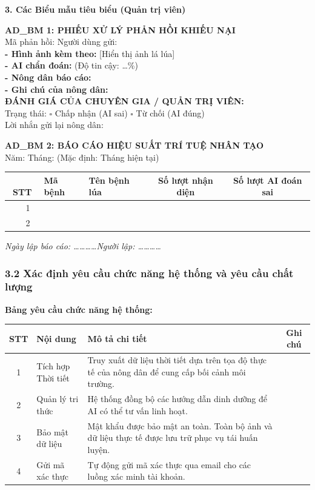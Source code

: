 \documentclass[12pt,a4paper]{article}
\begin{document}
\vspace{0.5cm}
\noindent \textbf{3. Các Biểu mẫu tiêu biểu (Quản trị viên)}

\noindent \textbf{AD\_BM 1: PHIẾU XỬ LÝ PHẢN HỒI KHIẾU NẠI} \\
Mã phản hồi: \dotfill Người dùng gửi: \dotfill \\
\textbf{- Hình ảnh kèm theo:} [Hiển thị ảnh lá lúa] \\
\textbf{- AI chẩn đoán:} \dotfill (Độ tin cậy: \dots \%) \\
\textbf{- Nông dân báo cáo:} \dotfill \\
\textbf{- Ghi chú của nông dân:} \dotfill \\
\vspace{0.2cm}
\textbf{ĐÁNH GIÁ CỦA CHUYÊN GIA / QUẢN TRỊ VIÊN:} \\
Trạng thái: $\square$ Chấp nhận (AI sai) \quad $\square$ Từ chối (AI đúng) \\
Lời nhắn gửi lại nông dân: \dotfill \\
\dotfill

\vspace{0.5cm}
\noindent \textbf{AD\_BM 2: BÁO CÁO HIỆU SUẤT TRÍ TUỆ NHÂN TẠO} \\
Năm: \dotfill Tháng: \dotfill (Mặc định: Tháng hiện tại)

\begin{longtable}{|c|l|p{4cm}|c|c|}
\hline
\rowcolor{headerblue}
  \textbf{STT}&\textbf{Mã bệnh}& \textbf{Tên bệnh lúa} & \textbf{Số lượt nhận diện}& \textbf{Số lượt AI đoán sai} \\
\hline
   1 && & & \\
\hline
   2 && & & \\
\hline
\end{longtable}
\textit{Ngày lập báo cáo: \dots\dots\dots\dots Người lập: \dots\dots\dots\dots}

\hrulefill

\subsubsection*{3.2 Xác định yêu cầu chức năng hệ thống và yêu cầu chất lượng}

\textbf{Bảng yêu cầu chức năng hệ thống:}
\begin{longtable}{|c|p{4cm}|p{9cm}|c|}
\hline
\rowcolor{headerblue}
\textbf{STT} & \textbf{Nội dung} & \textbf{Mô tả chi tiết} & \textbf{Ghi chú} \\
\hline
\endhead
1 & Tích hợp Thời tiết & Truy xuất dữ liệu thời tiết dựa trên tọa độ thực tế của nông dân để cung cấp bối cảnh môi trường. & \\
\hline
2 & Quản lý tri thức & Hệ thống đồng bộ các hướng dẫn dinh dưỡng để AI có thể tư vấn linh hoạt. & \\
\hline
3 & Bảo mật dữ liệu & Mật khẩu được bảo mật an toàn. Toàn bộ ảnh và dữ liệu thực tế được lưu trữ phục vụ tái huấn luyện. & \\
\hline
4 & Gửi mã xác thực & Tự động gửi mã xác thực qua email cho các luồng xác minh tài khoản. & \\
\hline
\end{longtable}
\end{document}
